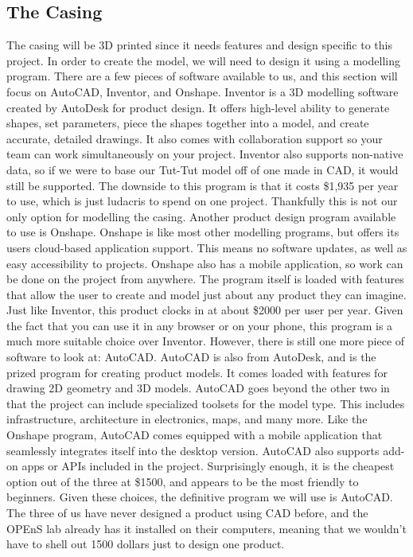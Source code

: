 \documentclass[letterpaper,10pt,draftclsnofoot,onecolumn]{article}
\begin{document}
\subsection{The Casing}
The casing will be 3D printed since it needs features and design specific to this project. In order to create the model, we will need to design it using a modelling program. There are a few pieces of software available to us, and this section will focus on AutoCAD, Inventor, and Onshape. 
\newline
\newline
Inventor is a 3D modelling software created by AutoDesk for product design. It offers high-level ability to generate shapes, set parameters, piece the shapes together into a model, and create accurate, detailed drawings. It also comes with collaboration support so your team can work simultaneously on your project. Inventor also supports non-native data, so if we were to base our Tut-Tut model off of one made in CAD, it would still be supported. The downside to this program is that it costs \$1,935 per year to use, which is just ludacris to spend on one project. Thankfully this is not our only option for modelling the casing.
\cite{inventor}
\newline
\newline
Another product design program available to use is Onshape. Onshape is like most other modelling programs, but offers its users cloud-based application support. This means no software updates, as well as easy accessibility to projects. Onshape also has a mobile application, so work can be done on the project from anywhere. The program itself is loaded with features that allow the user to create and model just about any product they can imagine. Just like Inventor, this product clocks in at about \$2000 per user per year. Given the fact that you can use it in any browser or on your phone, this program is a much more suitable choice over Inventor. However, there is still one more piece of software to look at: AutoCAD.
\cite{onshape}
\newline
\newline
AutoCAD is also from AutoDesk, and is the prized program for creating product models. It comes loaded with features for drawing 2D geometry and 3D models. AutoCAD goes beyond the other two in that the project can include specialized toolsets for the model type. This includes infrastructure, architecture in electronics, maps, and many more. Like the Onshape program, AutoCAD comes equipped with a mobile application that seamlessly integrates itself into the desktop version. AutoCAD also supports add-on apps or APIs included in the project. Surprisingly enough, it is the cheapest option out of the three at \$1500, and appears to be the most friendly to beginners.
\cite{autocad}
\newline
\newline
Given these choices, the definitive program we will use is AutoCAD. The three of us have never designed a product using CAD before, and the OPEnS lab already has it installed on their computers, meaning that we wouldn't have to shell out 1500 dollars just to design one product. 
\end{document}
